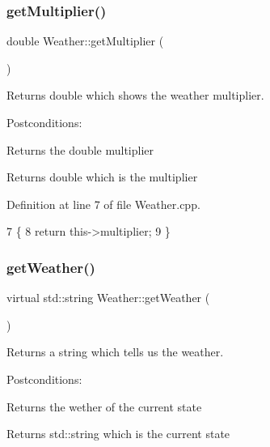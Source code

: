 \subsubsection{\texorpdfstring{get\+Multiplier()}{getMultiplier()}}
{\footnotesize\ttfamily double Weather\+::get\+Multiplier (\begin{DoxyParamCaption}{ }\end{DoxyParamCaption})}



Returns double which shows the weather multiplier. 

Postconditions\+:
\begin{DoxyItemize}
\item Returns the double multiplier
\end{DoxyItemize}

\begin{DoxyReturn}{Returns}
double which is the multiplier 
\end{DoxyReturn}


Definition at line 7 of file Weather.\+cpp.


\begin{DoxyCode}
7                               \{
8     \textcolor{keywordflow}{return} this->multiplier;
9 \}
\end{DoxyCode}
\mbox{\label{classWeather_ad0a29227308b87e98808cdff52232df3}} 
\subsubsection{\texorpdfstring{get\+Weather()}{getWeather()}}
{\footnotesize\ttfamily virtual std\+::string Weather\+::get\+Weather (\begin{DoxyParamCaption}{ }\end{DoxyParamCaption})\hspace{0.3cm}{\ttfamily [pure virtual]}}



Returns a string which tells us the weather. 

Postconditions\+:
\begin{DoxyItemize}
\item Returns the wether of the current state
\end{DoxyItemize}

\begin{DoxyReturn}{Returns}
std\+::string which is the current state 
\end{DoxyReturn}
\mbox{\label{classWeather_afc84c48c326fc967915833e689bfa40c}} 
